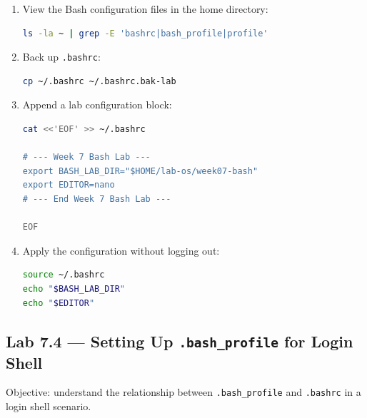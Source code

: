 \begin{enumerate}
  \item View the Bash configuration files in the home directory:
\begin{lstlisting}[language=bash, caption={Listing Bash configuration files}]
ls -la ~ | grep -E 'bashrc|bash_profile|profile'
\end{lstlisting}

  \item Back up \texttt{.bashrc}:
\begin{lstlisting}[language=bash, caption={Backing up .bashrc}]
cp ~/.bashrc ~/.bashrc.bak-lab
\end{lstlisting}

  \item Append a lab configuration block:
\begin{lstlisting}[language=bash, caption={Adding configuration to .bashrc}]
cat <<'EOF' >> ~/.bashrc

# --- Week 7 Bash Lab ---
export BASH_LAB_DIR="$HOME/lab-os/week07-bash"
export EDITOR=nano
# --- End Week 7 Bash Lab ---

EOF
\end{lstlisting}

  \item Apply the configuration without logging out:
\begin{lstlisting}[language=bash, caption={Reloading .bashrc}]
source ~/.bashrc
echo "$BASH_LAB_DIR"
echo "$EDITOR"
\end{lstlisting}
\end{enumerate}

\subsection*{Lab 7.4 --- Setting Up \texttt{.bash\_profile} for Login Shell}

Objective: understand the relationship between \texttt{.bash\_profile} and
\texttt{.bashrc} in a login shell scenario.

